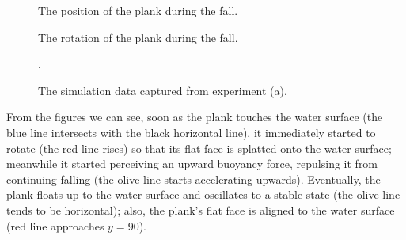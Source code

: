 \begin{figure}[htb]
	\centering
	\begin{subcaptionblock}{0.48\textwidth}
		\centering
		\caption{The position of the plank during the fall.}
		\label{simulation-result-heights}
	\end{subcaptionblock}
	\begin{subcaptionblock}{0.48\textwidth}
		\centering
		\caption{The rotation of the plank during the fall.}
		\label{simulation-result-rot}
	\end{subcaptionblock}
	\caption{The simulation data captured from experiment (a).}.
	\label{simulation-result}
\end{figure}

From the figures we can see, soon as the plank touches the water surface (the blue line intersects with the black horizontal line), it immediately started to rotate (the red line rises) so that its flat face is splatted onto the water surface;
meanwhile it started perceiving an upward buoyancy force, repulsing it from continuing falling (the olive line starts accelerating upwards).
Eventually, the plank floats up to the water surface and oscillates to a stable state (the olive line tends to be horizontal);
also, the plank's flat face is aligned to the water surface (red line approaches $y=90$).

